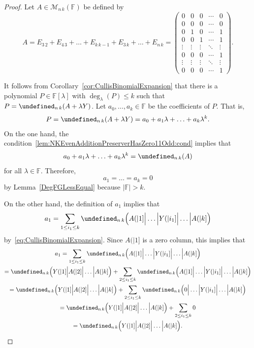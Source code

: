 \documentclass{elsarticle}
\def\F{{\mathbb F}}
\def\M{{\mathcal M}}
\let\det\undefined
\DeclareMathOperator{\det}{det}
\theoremstyle{plain}
\theoremstyle{definition}
\numberwithin{equation}{section}
\begin{document}
\begin{proof}Let $A \in \M_{n\, k}(\F)$ be defined by
\[
A = E_{3\,2} + E_{4\,3} + \ldots + E_{k\, k-1} + E_{3\, k} + \ldots + E_{n\, k}  = \begin{pmatrix}
0 & 0 & 0 & \cdots & 0\\
0 & 0 & 0 & \cdots & 0\\
0 & 1 & 0 &\cdots & 1\\
0 & 0 & 1 &\cdots & 1\\
\vdots & \vdots & \vdots & \ddots & \vdots\\
0 & 0 & 0 & \cdots & 1\\
\vdots & \vdots & \vdots & \ddots & \vdots\\
0 & 0 & 0 & \cdots & 1
\end{pmatrix}.
\]

It follows from Corollary~\ref{cor:CullisBinomialExpansion} that there is a polynomial $P \in \F[\lambda]$ with $\deg_{\lambda}(P) \le k$ such that $P = \det_{n\, k} (A + \lambda Y)$. Let $a_0, \ldots, a_k \in \F$ be the coefficients of $P$. That is,
 \[P =   \det_{n\, k} (A + \lambda Y) = a_0 + a_1\lambda + \ldots + a_k \lambda^k.
  \]
On the one hand, the condition~\eqref{lem:NKEvenAdditionPreserverHasZero11Odd:cond} implies that
\[
a_0 + a_1\lambda + \ldots + a_k \lambda^k = \det_{n\,k} (A)
\]
for all $\lambda \in \F$. Therefore, 
\begin{equation}\label{lem:NKEvenAdditionPreserverHasZero11Odd:eq3}
a_1 = \ldots = a_k = 0
\end{equation}
 by Lemma~\ref{DegFGLessEqual} because  $|\F| > k$.

On the other hand, the definition of $a_1$ implies that
\[
a_1 = \sum_{1 \le i_1 \le k} \det_{n\,k}\Bigl(A(|1]\Big|\ldots \Big| Y(|i_1] \Big| \ldots \Big| A(|k] \Bigr)
\]
by~\eqref{eq:CullisBinomialExpansion}. Since $A(|1]$ is a zero column, this implies that 
\begin{multline*}
a_1 = \sum_{1 \le i_1 \le k} \det_{n\,k}\Bigl(A(|1]\Big|\ldots \Big| Y(|i_1] \Big| \ldots \Big| A(|k] \Bigr)\\
 = \det_{n\,k} \Bigl(Y(|1] \Big| A(|2] \Big| \ldots \Big| A(|k]\Bigr)  + \sum_{2 \le i_1 \le k} \det_{n\,k}\Bigl(A(|1]\Big|\ldots \Big| Y(|i_1] \Big| \ldots \Big| A(|k] \Bigr)\\
 = \det_{n\,k} \Bigl(Y(|1] \Big| A(|2] \Big| \ldots \Big| A(|k]\Bigr)  + \sum_{2 \le i_1 \le k} \det_{n\,k}\Bigl(0\Big|\ldots \Big| Y(|i_1] \Big| \ldots \Big| A(|k] \Bigr)\\
 =  \det_{n\,k} \Bigl(Y(|1] \Big| A(|2] \Big| \ldots \Big| A(|k]\Bigr) + \sum_{2 \le i_1 \le k} 0\\
 = \det_{n\,k} \Bigl(Y(|1] \Big| A(|2] \Big| \ldots \Big| A(|k]\Bigr).
\end{multline*}


\end{proof}
\end{document}
